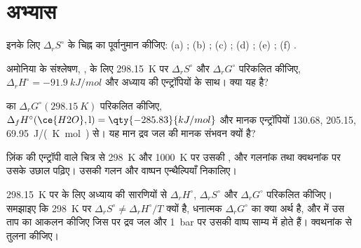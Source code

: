 \section{अभ्यास}

\begin{exercise}[$\star$]\label{exo:b2:reaction-free-energy:1}
इनके लिए $\Delta_r S^\circ$ के चिह्न का पूर्वानुमान कीजिए: (a) ;
(b) ; (c) ;
(d) ; (e) ;
(f) .
\end{exercise}

\begin{exercise}[$\star$]\label{exo:b2:reaction-free-energy:2}
अमोनिया के संश्लेषण, , के लिए \qty{298.15}{K} पर
$\Delta_r S^\circ$ और $\Delta_r G^\circ$ परिकलित कीजिए, $\Delta_r
H^\circ = \qty{-91.9}{kJ/mol}$ और अध्याय की एन्ट्रॉपियों के साथ। क्या यह
 है?
\end{exercise}

\begin{exercise}[$\star$]\label{exo:b2:reaction-free-energy:3}
 का $\Delta_r G^\circ(\qty{298.15}{K})$ परिकलित कीजिए, $\Delta_f H^\circ(\ce{H2O}, \text{l}) = \qty{-285.83}{kJ/mol}$
और मानक एन्ट्रॉपियों  130.68,  205.15,
 \qty{69.95}{J/(K.mol)} से। यह मान द्रव जल की मानक संभवन
 क्यों है?
\end{exercise}

\begin{exercise}[$\star$]\label{exo:b2:reaction-free-energy:4}
ज़िंक की एन्ट्रॉपी वाले चित्र से \qty{298}{K} और \qty{1000}{K} पर उसकी , और गलनांक तथा क्वथनांक पर उसके उछाल पढ़िए।
उसकी गलन और वाष्पन एन्थैल्पियाँ निकालिए।
\end{exercise}

\begin{exercise}[$\star\star$]\label{exo:b2:reaction-free-energy:5}
\qty{298.15}{K} पर  के लिए अध्याय की सारणियों से $\Delta_r H^\circ$,
$\Delta_r S^\circ$ और $\Delta_r G^\circ$ परिकलित कीजिए।
समझाइए कि \qty{298}{K} पर $\Delta_r S^\circ \neq \Delta_r H^\circ/T$ क्यों है,
धनात्मक $\Delta_r G^\circ$ का क्या अर्थ है, और  में
उस ताप का आकलन कीजिए जिस पर द्रव जल और \qty{1}{bar} पर उसकी वाष्प
साम्य में होते हैं। क्वथनांक से तुलना कीजिए।
\end{exercise}

